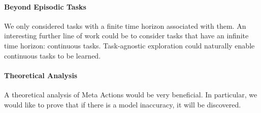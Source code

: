 \paragraph*{Beyond Episodic Tasks}
We only considered tasks with a finite time horizon associated with them. An interesting further line of work could be to consider tasks that have an infinite time horizon: continuous tasks. Task-agnostic exploration could naturally enable continuous tasks to be learned.

\paragraph*{Theoretical Analysis}
A theoretical analysis of Meta Actions would be very beneficial. In particular, we would like to prove that if there is a model inaccuracy, it will be discovered.

